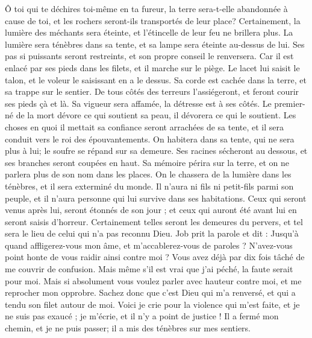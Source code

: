\begin{multicols}{2}
Ô toi qui te déchires toi-même en ta fureur, la terre sera-t-elle abandonnée à cause de toi, et les rochers seront-ils transportés de leur place? 
Certainement, la lumière des méchants sera éteinte, et l'étincelle de leur feu ne brillera plus.
La lumière sera ténèbres dans sa tente, et sa lampe sera éteinte au-dessus de lui. 
Ses pas si puissants seront restreints, et son propre conseil le renversera. 
Car il est enlacé par ses pieds dans les filets, et il marche sur le piège.
Le lacet lui saisit le talon, et le voleur le saisissant en a le dessus. 
Sa corde est cachée dans la terre, et sa trappe sur le sentier. 
De tous côtés des terreurs l'assiégeront, et feront courir ses pieds çà et là.
Sa vigueur sera affamée, la détresse est à ses côtés.
Le premier-né de la mort dévore ce qui soutient sa peau, il dévorera ce qui le soutient. 
 Les choses en quoi il mettait sa confiance seront arrachées de sa tente, et il sera conduit vers le roi des épouvantements. 
On habitera dans sa tente, qui ne sera plus à lui; le soufre se répand sur sa demeure. 
Ses racines sécheront au dessous, et ses branches seront coupées en haut. 
Sa mémoire périra sur la terre, et on ne parlera plus de son nom dans les places.
On le chassera de la lumière dans les ténèbres, et il sera exterminé du monde. 
Il n'aura ni fils ni petit-fils parmi son peuple, et il n'aura personne qui lui survive dans ses habitations. 
Ceux qui seront venus après lui, seront étonnés de son jour ; et ceux qui auront été avant lui en seront saisis d'horreur. 
Certainement telles seront les demeures du pervers, et tel sera le lieu de celui qui n'a pas reconnu Dieu.
\VerseOne{}Job prit la parole et dit :
Jusqu'à quand affligerez-vous mon âme, et m'accablerez-vous de paroles ? N'avez-vous point honte de vous raidir ainsi contre moi ?  
Vous avez déjà par dix fois tâché de me couvrir de confusion. 
Mais même s'il est vrai que j'ai péché, la faute serait pour moi. 
Mais si absolument vous voulez parler avec hauteur contre moi, et me reprocher mon opprobre. 
Sachez donc que c'est Dieu qui m'a renversé, et qui a tendu son filet autour de moi. 
Voici je crie pour la violence qui m'est faite, et je ne suis pas exaucé ; je m'écrie, et il n'y a point de justice !
Il a fermé mon chemin, et je ne puis passer; il a mis des ténèbres sur mes sentiers. 

\end{multicols}
